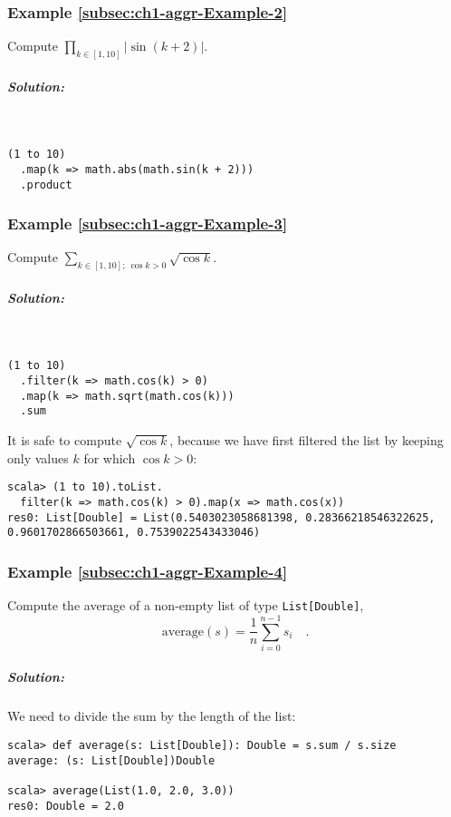 \subsubsection{Example \label{subsec:ch1-aggr-Example-2}\ref{subsec:ch1-aggr-Example-2}}

Compute $\prod_{k\in\left[1,10\right]}\left|\sin\left(k+2\right)\right|$.

\subparagraph{Solution:}

~
\begin{lstlisting}
(1 to 10)
  .map(k => math.abs(math.sin(k + 2)))
  .product
\end{lstlisting}


\subsubsection{Example \label{subsec:ch1-aggr-Example-3}\ref{subsec:ch1-aggr-Example-3}}

Compute $\sum_{k\in[1,10];~\cos k>0}\sqrt{\cos k}$.

\subparagraph{Solution:}

~

\begin{lstlisting}
(1 to 10)
  .filter(k => math.cos(k) > 0)
  .map(k => math.sqrt(math.cos(k)))
  .sum
\end{lstlisting}
It is safe to compute $\sqrt{\cos k}$, because we have first filtered
the list by keeping only values $k$ for which $\cos k>0$:
\begin{lstlisting}
scala> (1 to 10).toList.
  filter(k => math.cos(k) > 0).map(x => math.cos(x))
res0: List[Double] = List(0.5403023058681398, 0.28366218546322625, 0.9601702866503661, 0.7539022543433046)
\end{lstlisting}


\subsubsection{Example \label{subsec:ch1-aggr-Example-4}\ref{subsec:ch1-aggr-Example-4}}

Compute the average of a non-empty list of type \lstinline!List[Double]!,
\[
\text{average}\left(s\right)=\frac{1}{n}\sum_{i=0}^{n-1}s_{i}\quad.
\]


\subparagraph{Solution:}

We need to divide the sum by the length of the list:
\begin{lstlisting}
scala> def average(s: List[Double]): Double = s.sum / s.size
average: (s: List[Double])Double

scala> average(List(1.0, 2.0, 3.0))
res0: Double = 2.0
\end{lstlisting}


